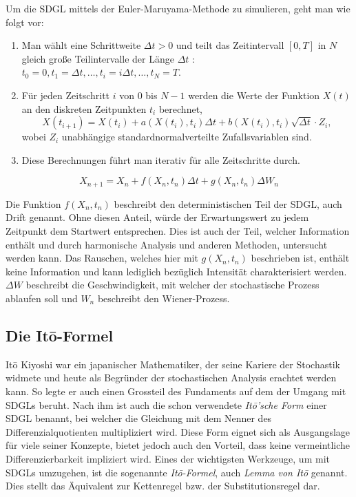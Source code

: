 Um die SDGL mittels der Euler-Maruyama-Methode zu simulieren, geht man wie folgt vor:

\begin{enumerate}
	\item Man wählt eine Schrittweite $ \Delta t > 0 $ und teilt das Zeitintervall $ [0, T] $ in $ N $ gleich große Teilintervalle der Länge $ \Delta t$ : $ t_0 = 0, t_1 = \Delta t, \dots, t_i = i\Delta t, \dots, t_N = T $.
	\item Für jeden Zeitschritt $ i $ von $ 0 $ bis $ N-1 $ werden die Werte der Funktion $ X(t) $ an den diskreten Zeitpunkten $ t_i $ berechnet,
	\begin{equation}
		X(t_{i+1}) = X(t_i) + a(X(t_i), t_i) \Delta t + b(X(t_i), t_i) \sqrt{\Delta t} \cdot Z_i,
	\end{equation}
	wobei $ Z_i $ unabhängige standardnormalverteilte Zufallsvariablen sind.
	\item Diese Berechnungen führt man iterativ für alle Zeitschritte durch.
\end{enumerate}

\begin{equation}
	X_{n+1} = X_n + f(X_n,t_n) \Delta t + g(X_n,t_n) \Delta W_n
\end{equation}

Die Funktion $ f(X_n,t_n) $ beschreibt den deterministischen Teil der SDGL, auch Drift genannt. Ohne diesen Anteil, würde der Erwartungswert zu jedem Zeitpunkt dem Startwert entsprechen. Dies ist auch der Teil, welcher Information enthält und durch harmonische Analysis und anderen Methoden, untersucht werden kann. Das Rauschen, welches hier mit $ g(X_n,t_n) $ beschrieben ist, enthält keine Information und kann lediglich bezüglich Intensität charakterisiert werden. $ \Delta W $ beschreibt die Geschwindigkeit, mit welcher der stochastische Prozess ablaufen soll und $ W_n $  beschreibt den Wiener-Prozess.



\subsection{Die Itō-Formel\label{brown:ito}}

Itō Kiyoshi war ein japanischer Mathematiker, der seine Kariere der Stochastik widmete und heute als Begründer der stochastischen Analysis erachtet werden kann. So legte er auch einen Grossteil des Fundaments auf dem der Umgang mit SDGLs beruht. 
Nach ihm ist auch die schon verwendete \textit{Itō'sche Form} einer SDGL benannt, bei welcher die Gleichung mit dem Nenner des Differenzialquotienten multipliziert wird. Diese Form eignet sich als Ausgangslage für viele seiner Konzepte, bietet jedoch auch den Vorteil, dass keine vermeintliche Differenzierbarkeit impliziert wird.
Eines der wichtigsten Werkzeuge, um mit SDGLs umzugehen, ist die sogenannte \textit{Itō-Formel}, auch \textit{Lemma von Itō} genannt. Dies stellt das Äquivalent zur Kettenregel bzw. der Substitutionsregel dar. %


